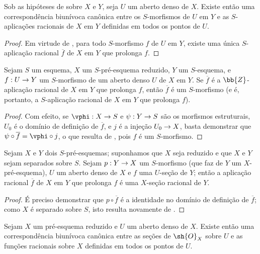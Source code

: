 \documentclass[oneside]{amsart}
\makeatletter
\newcommand{\ega@arrow}[2]{\mathchoice{#1}{#2}{#2}{#2}}
\renewcommand{\to}{\ega@arrow{\longrightarrow}{\rightarrow}}
\newcommand{\oldpage}[2][]{{\marginnote{\normalfont\textbf{#1}~|~#2}}\ignorespaces}
\let\EGAOriginalLabel\label
\renewcommand{\label}[1]{\phantomsection\EGAOriginalLabel{#1}}
\makeatother
\begin{document}
\begin{corollary}[7.2.3]
\label{I.7.2.3}
Sob as hipóteses de  sobre $X$ e $Y$, seja $U$ um aberto denso de $X$.
Existe então uma correspondência biunívoca canônica entre os $S$-morfismos de $U$ em $Y$ e as $S$-aplicações racionais de $X$ em $Y$ definidas em todos os pontos de $U$.
\end{corollary}

\begin{proof}
Em virtude de , para todo $S$-morfismo $f$ de $U$ em $Y$, existe uma única $S$-aplicação racional $\overline{f}$ de $X$ em $Y$ que prolonga $f$.
\end{proof}

\begin{corollary}[7.2.4]
\label{I.7.2.4}
Sejam $S$ um esquema, $X$ um $S$-pré-esquema reduzido, $Y$ um $S$-esquema, e $f:U\to Y$ um $S$-morfismo de um aberto denso $U$ de $X$ em $Y$.
Se $\overline{f}$ é a $\bb{Z}$-aplicação racional de $X$ em $Y$ que prolonga $f$, então $\overline{f}$ é um $S$-morfismo (e é, portanto, a $S$-aplicação racional de $X$ em $Y$ que prolonga $f$).
\end{corollary}

\begin{proof}
Com efeito, se $\vphi:X\to S$ e $\psi:Y\to S$ são os morfismos estruturais, $U_0$ é o domínio de definição de $\overline{f}$, e $j$ é a injeção $U_0\to X$, basta demonstrar que $\psi\circ\overline{f}=\vphi\circ j$, o que resulta de , pois $f$ é um $S$-morfismo.
\end{proof}

\begin{corollary}[7.2.5]
\label{I.7.2.5}
Sejam $X$ e $Y$ dois $S$-pré-esquemas; suponhamos que $X$ seja reduzido e que $X$ e $Y$ sejam separados sobre $S$.
Sejam $p:Y\to X$ um $S$-morfismo (que faz de $Y$ um $X$-pré-esquema), $U$ um aberto denso de $X$ e $f$ uma $U$-seção de $Y$; então a aplicação racional $\overline{f}$ de $X$ em $Y$ que prolonga $f$ é uma $X$-seção racional de $Y$.
\end{corollary}

\oldpage[I]{160}
\begin{proof}
É preciso demonstrar que $p\circ\overline{f}$ é a identidade no domínio de definição de $\overline{f}$; como $X$ é separado sobre $S$, isto resulta novamente de .
\end{proof}

\begin{corollary}[7.2.6]
\label{I.7.2.6}
Sejam $X$ um pré-esquema reduzido e $U$ um aberto denso de $X$.
Existe então uma correspondência biunívoca canônica entre as seções de $\sh{O}_X$ sobre $U$ e as funções racionais sobre $X$ definidas em todos os pontos de $U$.
\end{corollary}
\end{document}
